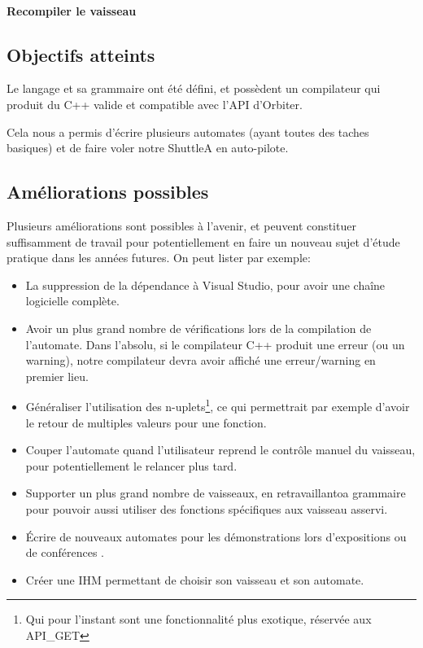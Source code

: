 \documentclass[a4paper,11pt]{article}
\begin{document}
        \paragraph{Recompiler le vaisseau}
            

    \subsection{Objectifs atteints}
        Le langage et sa grammaire ont été défini, et possèdent un compilateur qui produit du C++ valide et compatible avec l'API d'Orbiter.
        
        Cela nous a permis d'écrire plusieurs automates (ayant toutes des taches basiques) et de faire voler notre ShuttleA en auto-pilote.

    \subsection{Améliorations possibles}
        Plusieurs améliorations sont possibles à l'avenir, et peuvent constituer suffisamment de travail pour potentiellement en faire un nouveau sujet d'étude pratique dans les années futures.
        On peut lister par exemple:
        \begin{itemize}
            \item La suppression de la dépendance à Visual Studio, pour avoir une chaîne logicielle complète.
            \item Avoir un plus grand nombre de vérifications lors de la compilation de l'automate. Dans l'absolu, si le compilateur C++ produit une erreur (ou un warning), notre compilateur devra avoir affiché une erreur/warning en premier lieu.
            \item Généraliser l'utilisation des n-uplets\footnote{Qui pour l'instant sont une fonctionnalité plus exotique, réservée aux API\_GET}, ce qui permettrait par exemple d'avoir le retour de multiples valeurs pour une fonction.
            \item \og Couper \fg{} l'automate quand l'utilisateur reprend le contrôle manuel du vaisseau, pour potentiellement le relancer plus tard.
            \item Supporter un plus grand nombre de vaisseaux, en retravaillantoa grammaire pour pouvoir aussi utiliser des fonctions spécifiques aux vaisseau asservi.
            \item \'Ecrire de nouveaux automates pour les démonstrations lors d'expositions ou de conférences .
            \item Créer une IHM permettant de choisir son vaisseau et son automate.
        \end{itemize}
\end{document}
